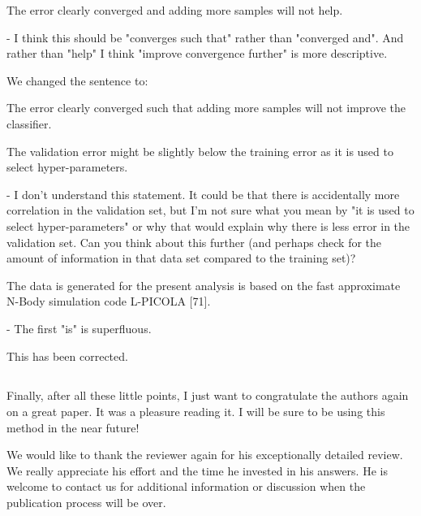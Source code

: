 \documentclass[12pt,a4paper]{article}
\newcommand{\nati}[1]{{\color[rgb]{.1,.6,.1}{NP: #1}}}
\newcommand{\1}{\b{1}}              %
\newcommand{\0}{\b{0}}              %
\begin{document}
\begin{mdframed}[style=comment]
The error clearly converged and adding more samples will not help.

- I think this should be "converges such that" rather than "converged and". And rather than "help" I think "improve convergence further" is more descriptive.
\end{mdframed}
We changed the sentence to:
\begin{mdframed}[style=manuscript]
The error clearly converged such that adding more samples will not improve the classifier.
\end{mdframed}

\begin{mdframed}[style=comment]
The validation error might be slightly below the training error as it is used to select hyper-parameters.

- I don't understand this statement. It could be that there is accidentally more correlation in the validation set, but I'm not sure what you mean by "it is used to select hyper-parameters" or why that would explain why there is less error in the validation set. Can you think about this further (and perhaps check for the amount of information in that data set compared to the training set)?
\end{mdframed}
\nati{
We changed the sentence as:
\begin{mdframed}[style=manuscript]
The validation error might be slightly below the training error as the validation set is used to select hyper-parameters.
\end{mdframed}
For linear SVM, there is one hyper-parameter to tune. As we select the hyperparameter with the lowest validation error, it is possible that the validation error is lower than the training error.}

\begin{mdframed}[style=comment]
The data is generated for the present analysis is based on the fast approximate N-Body simulation code L-PICOLA [71].

- The first "is" is superfluous.
\end{mdframed}
This has been corrected.

\subsection{}

\begin{mdframed}[style=comment]

Finally, after all these little points, I just want to congratulate the authors again on a great paper. It was a pleasure reading it. I will be sure to be using this method in the near future!
\end{mdframed}
We would like to thank the reviewer again for his exceptionally detailed review. We really appreciate his effort and the time he invested in his answers.
He is welcome to contact us for additional information or discussion when the publication process will be over.



\clearpage
\newpage



\end{document}
